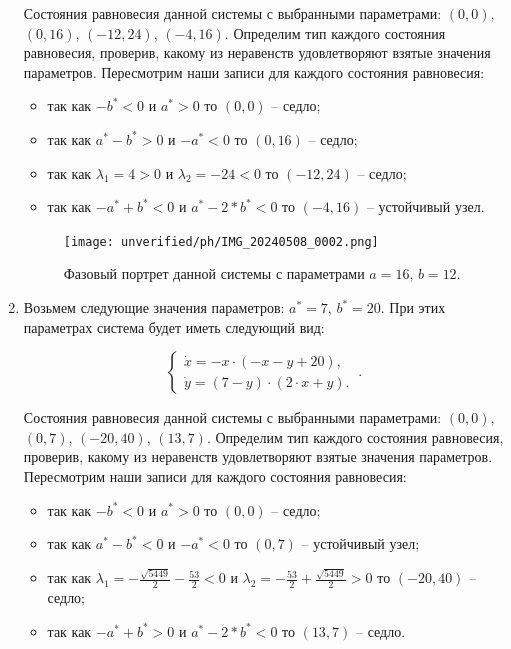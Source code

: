 \begin{enumerate}
Состояния равновесия данной системы с выбранными параметрами: $(0, 0)$, $(0, 16)$, $(-12, 24)$, $(-4, 16)$. Определим тип каждого состояния равновесия, проверив, какому из неравенств удовлетворяют взятые значения параметров.  Пересмотрим наши записи для каждого состояния равновесия: 
\begin{itemize}
\item{ так как $-b^\ast  < 0 $ и $a^\ast > 0 $ то $(0, 0)$ -- седло;}
\item{ так как $a^\ast - b^\ast > 0 $ и $-a^\ast  < 0 $ то $(0, 16)$ -- седло;}
\item{ так как ${\lambda_{1}} = 4 > 0 $ и ${\lambda_{2}} = -24  < 0 $ то $(-12, 24)$ -- седло;}
\item{ так как $-a^\ast + b^\ast  < 0 $ и $a^\ast - 2*b^\ast  < 0 $ то $(-4, 16)$ -- устойчивый узел.}
\end{itemize} 

\begin{figure}[!thb]
\texttt{[image: unverified/ph/IMG\_20240508\_0002.png]}
\centering
\caption{\label{fig:bifdiag2} Фазовый портрет данной системы с параметрами $a = 16$, $b = 12$.}
\end{figure}

\newpage
\item
Возьмем следующие значения параметров:  $a^\ast = 7$, $b^\ast = 20$. При этих параметрах система будет иметь следующий вид: 

$$
\left \lbrace 
\begin{matrix} 
\dot{x} = -x \cdot (-x - y + 20), \\
\dot{y} = (7 - y) \cdot (2 \cdot x + y). \
\end{matrix} 
\right . .$$

Состояния равновесия данной системы с выбранными параметрами: $(0, 0)$, $(0, 7)$, $(-20, 40)$, $(13, 7)$. Определим тип каждого состояния равновесия, проверив, какому из неравенств удовлетворяют взятые значения параметров.  Пересмотрим наши записи для каждого состояния равновесия: 
\begin{itemize}
\item{ так как $-b^\ast  < 0 $ и $a^\ast > 0 $ то $(0, 0)$ -- седло;}
\item{ так как $a^\ast - b^\ast  < 0 $ и $-a^\ast  < 0 $ то $(0, 7)$ -- устойчивый узел;}
\item{ так как ${\lambda_{1}} = - \frac{\sqrt{5449}}{2} - \frac{53}{2}  < 0 $ и ${\lambda_{2}} = - \frac{53}{2} + \frac{\sqrt{5449}}{2} > 0 $ то $(-20, 40)$ -- седло;}
\item{ так как $-a^\ast + b^\ast > 0 $ и $a^\ast - 2*b^\ast  < 0 $ то $(13, 7)$ -- седло.}
\end{itemize} 


\end{enumerate}
